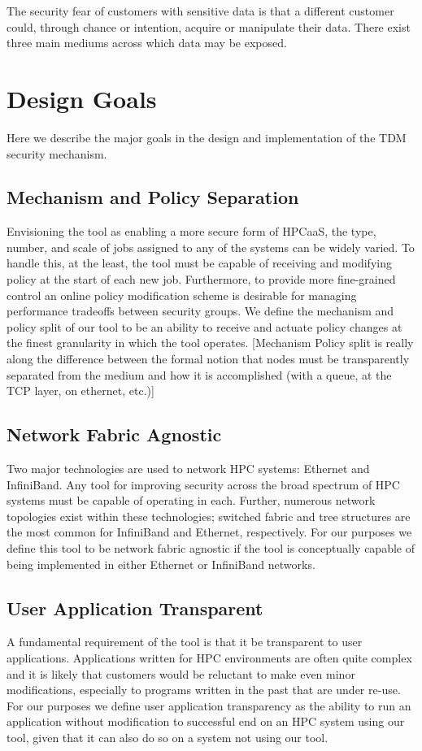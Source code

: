 \documentclass{article}
\begin{document}
The security fear of customers with sensitive data is that a different customer could, through chance or intention, acquire or manipulate their data. There exist three main mediums across which data may be exposed. 
\section{Design Goals}
Here we describe the major goals in the design and implementation of the TDM security mechanism.
\subsection{Mechanism and Policy Separation}
Envisioning the tool as enabling a more secure form of HPCaaS, the type, number, and scale of jobs assigned to any of the systems can be widely varied. To handle this, at the least, the tool must be capable of receiving and modifying policy at the start of each new job. Furthermore, to provide more fine-grained control an online policy modification scheme is desirable for managing performance tradeoffs between security groups. We define the mechanism and policy split of our tool to be an ability to receive and actuate policy changes at the finest granularity in which the tool operates. [Mechanism Policy split is really along the difference between the formal notion that nodes must be transparently separated from the medium and how it is accomplished (with a queue, at the TCP layer, on ethernet, etc.)]
\subsection{Network Fabric Agnostic}
Two major technologies are used to network HPC systems: Ethernet and InfiniBand. Any tool for improving security across the broad spectrum of HPC systems must be capable of operating in each. Further, numerous network topologies exist within these technologies; switched fabric and tree structures are the most common for InfiniBand and Ethernet, respectively. For our purposes we define this tool to be network fabric agnostic if the tool is conceptually capable of being implemented in either Ethernet or InfiniBand networks. 
\subsection{User Application Transparent}
A fundamental requirement of the tool is that it be transparent to user applications. Applications written for HPC environments are often quite complex and it is likely that customers would be reluctant to make even minor modifications, especially to programs written in the past that are under re-use. For our purposes we define user application transparency as the ability to run an application without modification to successful end on an HPC system using our tool, given that it can also do so on a system not using our tool. 
\end{document}
